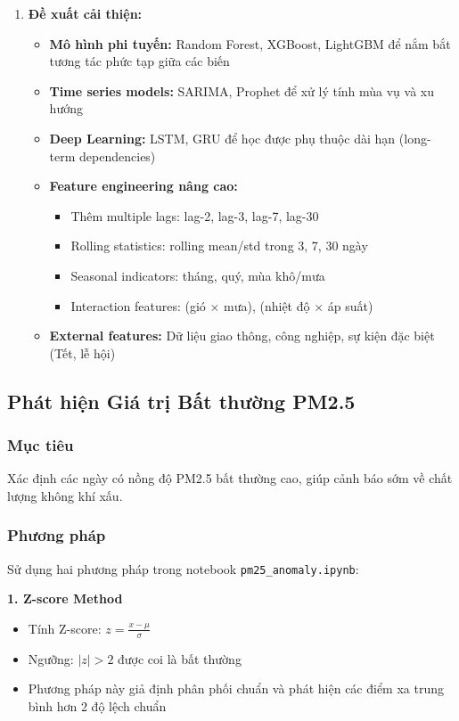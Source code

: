 \documentclass[12pt,a4paper]{article}
\begin{document}
\begin{enumerate}
    \item \textbf{Đề xuất cải thiện:}
    \begin{itemize}
        \item \textbf{Mô hình phi tuyến:} Random Forest, XGBoost, LightGBM để nắm bắt tương tác phức tạp giữa các biến
        \item \textbf{Time series models:} SARIMA, Prophet để xử lý tính mùa vụ và xu hướng
        \item \textbf{Deep Learning:} LSTM, GRU để học được phụ thuộc dài hạn (long-term dependencies)
        \item \textbf{Feature engineering nâng cao:}
        \begin{itemize}
            \item Thêm multiple lags: lag-2, lag-3, lag-7, lag-30
            \item Rolling statistics: rolling mean/std trong 3, 7, 30 ngày
            \item Seasonal indicators: tháng, quý, mùa khô/mưa
            \item Interaction features: (gió × mưa), (nhiệt độ × áp suất)
        \end{itemize}
        \item \textbf{External features:} Dữ liệu giao thông, công nghiệp, sự kiện đặc biệt (Tết, lễ hội)
    \end{itemize}
\end{enumerate}

\subsection{Phát hiện Giá trị Bất thường PM2.5}

\subsubsection{Mục tiêu}
Xác định các ngày có nồng độ PM2.5 bất thường cao, giúp cảnh báo sớm về chất lượng không khí xấu.

\subsubsection{Phương pháp}

Sử dụng hai phương pháp trong notebook \texttt{pm25\_anomaly.ipynb}:

\textbf{1. Z-score Method}
\begin{itemize}
    \item Tính Z-score: $z = \frac{x - \mu}{\sigma}$
    \item Ngưỡng: $|z| > 2$ được coi là bất thường
    \item Phương pháp này giả định phân phối chuẩn và phát hiện các điểm xa trung bình hơn 2 độ lệch chuẩn
\end{itemize}
\end{document}
